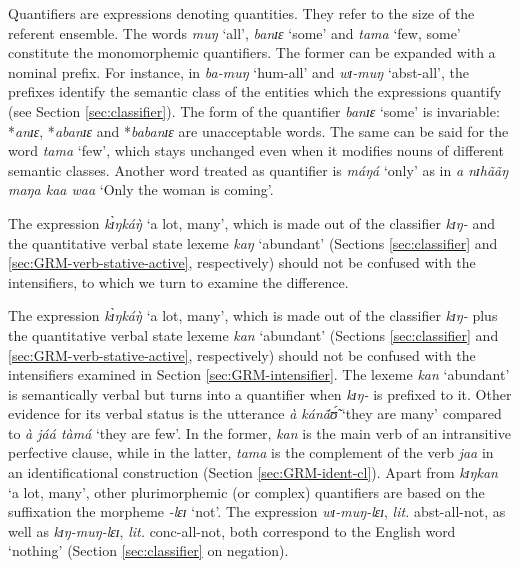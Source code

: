 \begin{exe}
\begin{exe}
\begin{exe}
{\begin{exe}
\begin{exe}
\begin{exe}
\begin{exe}
\begin{exe}
\begin{exe}
\begin{exe}
\begin{xlist}
\begin{exe}
Quantifiers are expressions denoting quantities. They refer to the size of the
referent ensemble. The words {\it muŋ} `all',   {\it banɪɛ} `some' and {\it 
tama}
`few, some' constitute the  monomorphemic quantifiers. The  former can be
expanded with a  nominal prefix. For instance, in {\it ba-muŋ} `{\sc hum}-all'
and {\it wɪ-muŋ} `{\sc abst}-all',  the prefixes identify the semantic class of
the entities which the expressions quantify (see Section \ref{sec:classifier}). 
The form of the quantifier {\it banɪɛ} `some'  is  invariable: *{\it anɪɛ}, 
*{\it abanɪɛ} and *{\it babanɪɛ} are unacceptable words.  The same can be said 
for the
word {\it tama}
`few', which stays unchanged even  when it  modifies  nouns of different
semantic classes.  Another word treated as quantifier is {\it máŋá} `only' as
in {\it a nɪhããŋ maŋa kaa waa} `Only the woman is coming'.  



The 
expression {\it kɪ̀ŋkáŋ̀} `a lot, many', which is made out of the  
classifier  {\it kɪŋ-} and the quantitative verbal state lexeme {\it kaŋ}  
`abundant'   (Sections  \ref{sec:classifier} and 
\ref{sec:GRM-verb-stative-active}, respectively) should not be confused with 
the 
intensifiers,  to which
we turn to examine the difference.

The expression {\it kɪ̀ŋkáŋ̀} `a lot, many', which  is made out of the  
classifier  {\it kɪŋ-} plus the quantitative verbal state lexeme {\it kan}  
`abundant'   (Sections  \ref{sec:classifier} and 
\ref{sec:GRM-verb-stative-active}, respectively) should not be confused with the 
intensifiers  examined in Section \ref{sec:GRM-intensifier}.
The  lexeme {\it kan} `abundant'  is semantically verbal but turns into a 
quantifier when {\it kɪŋ-}  is prefixed to it.  Other evidence for its verbal 
status  is the utterance {\it à kánã́ʊ̃́} `they are many' compared to {\it à 
jáá tàmá} `they are few'.  In the former, {\it kan} is the main verb of an 
intransitive perfective clause, while in the latter, {\it tama} is the 
complement of the verb {\it jaa} in an identificational construction  (Section 
\ref{sec:GRM-ident-cl}). Apart from {\it  kɪŋkan}  `a lot, many',  other 
plurimorphemic (or complex) quantifiers are based on the suffixation the 
morpheme {\it  -lɛɪ} `not'. The expression {\it wɪ-muŋ-lɛɪ}, {\it lit.} {\sc 
abst}-all-not, as well as {\it kɪŋ-muŋ-lɛɪ},  {\it lit.} {\sc conc}-all-not,  
both correspond to the English word `nothing' (Section \ref{sec:classifier} on 
negation).


\end{exe}
\end{xlist}
\end{exe}
\end{exe}
\end{exe}
\end{exe}
\end{exe}
\end{exe}
\end{exe}}
\end{exe}
\end{exe}
\end{exe}
